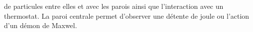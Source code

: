 de particules entre elles et avec les parois ainsi que l'interaction avec un thermostat.
%
La paroi centrale permet d'observer une détente de joule ou l'action d'un démon de Maxwel.
%
